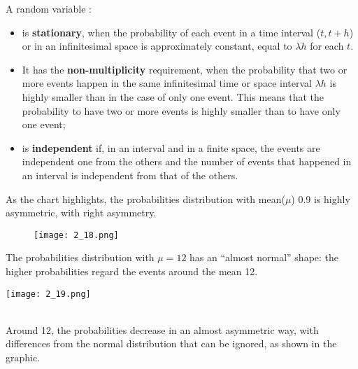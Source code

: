 \begin{frame}
  \vspace*{.25cm}
  A random variable :
  \begin{itemize}
    \item is \textbf{stationary}, when the probability of each event in a time interval ({\boldmath $ t, t + h $}) or in an infinitesimal space is approximately constant, equal to {\boldmath $ \lambda h $} for each $ t $.
    \item It has the \textbf{non-multiplicity} requirement, when the probability that two or more events happen in the same infinitesimal time or space interval $ \lambda h $ is highly smaller than in the case of only one event. This means that the probability to have two or more events is highly smaller than to have only one event;
    \item is \textbf{independent} if, in an interval and in a finite space, the events are independent one from the others and the number of events that happened in an interval is independent from that of the others.
  \end{itemize}
\end{frame}

\begin{frame}
  \vspace*{.25cm}
  As the chart highlights, the probabilities distribution with mean($ \mu $) 0.9 is highly asymmetric, with right asymmetry. \\
  \vspace*{.5cm}
  \begin{figure}
    \texttt{[image: 2\_18.png]}
  \end{figure}
\end{frame}

\begin{frame}
  \vspace*{.25cm}
  The probabilities distribution with $ \mu = 12 $ has an ``almost normal'' shape: the higher probabilities regard the events around the mean 12. \\
  \vspace*{.25cm}
  \begin{floatingfigure}[l]{6.5cm}
    \texttt{[image: 2\_19.png]} 
  \end{floatingfigure}
  \hspace*{.25cm}\\
  Around 12, the probabilities decrease in an almost asymmetric way, with differences from the normal distribution that can be ignored, as shown in the graphic.
\end{frame}


